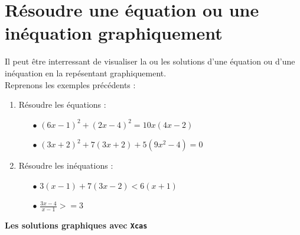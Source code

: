 \documentclass[a4paper,11pt]{book}
\begin{document}
\section{R\'esoudre une \'equation ou une in\'equation graphiquement}
Il peut \^etre interressant de visualiser la ou les solutions d'une \'equation 
ou d'une in\'equation en la rep\'esentant graphiquement.\\
Reprenons les exemples pr\'ec\'edents :
\begin{enumerate}
\item R\'esoudre les \'equations :
\begin{itemize}
\item[$\bullet$] $(6x-1)^2+(2x-4)^2=10x(4x-2)$
\item[$\bullet$] $(3x+2)^2+7(3x+2)+5(9x^2-4)=0$
\end{itemize}
\item R\'esoudre les in\'equations :
\begin{itemize}
\item[$\bullet$] $3(x-1)+7(3x-2)<6(x+1)$
\item[$\bullet$] $\displaystyle \frac{3x-4}{x-1}>=3$
\end{itemize}
\end{enumerate}
{\bf Les solutions graphiques avec {\tt Xcas}}
\end{document}
